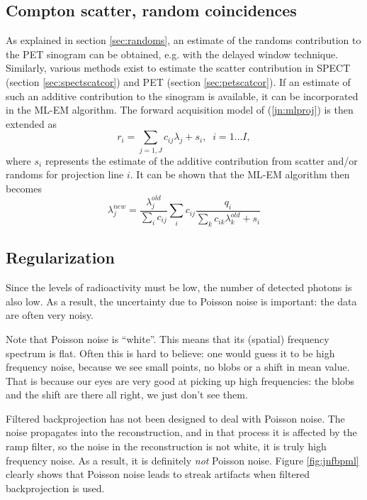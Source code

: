 \subsection{Compton scatter, random coincidences}
As explained in section \ref{sec:randoms}, an estimate of the randoms
contribution to the PET sinogram can be obtained, e.g. with the
delayed window technique. Similarly, various methods exist to estimate
the scatter contribution in SPECT (section \ref{sec:spectscatcor})
and PET (section \ref{sec:petscatcor}). If an estimate of such an
additive contribution to the sinogram is available, it can be
incorporated in the ML-EM algorithm. The forward acquisition model
of (\ref{jn:mlproj}) is then extended as 
\begin{equation}
  r_i = \sum_{j=1,J} c_{ij} \lambda_j + s_i, \;\; i = 1 \ldots I,
  \label{jn:mlprojscat}
\end{equation}
where $s_i$ represents the estimate of the additive contribution from
scatter and/or randoms for projection line $i$. It can be shown that
the ML-EM algorithm then becomes
\begin{equation}
  \lambda_j^{new}  =  \frac{\lambda_j^{old}}{\sum_i c_{ij}}
           \sum_i c_{ij}  \frac{q_i}{\sum_k c_{ik} \lambda_k^{old} + s_i}
           \label{eq:jnmlemscat}
\end{equation}



\subsection{Regularization} \label{sec:regularization}
Since the levels of radioactivity must be low, the number of detected photons
is also low. As a result, the uncertainty due to Poisson noise is important:
the data are often very noisy. 

Note that Poisson noise is ``white''. This means that its (spatial) frequency
spectrum is flat. Often this is hard to believe: one would guess it to be high
frequency noise, because we see small points, no blobs or a shift in mean
value.  That is because our eyes are very good at picking up high frequencies:
the blobs and the shift are there all right, we just don't see them.

Filtered backprojection has not been designed to deal with Poisson
noise. The noise propagates into the reconstruction, and in that
process it is affected by the ramp filter, so the noise in the
reconstruction is not white, it is truly high frequency noise. As a
result, it is definitely {\em not} Poisson noise. Figure
\ref{fig:jnfbpml} clearly shows that Poisson noise leads to streak
artifacts when filtered backprojection is used.

